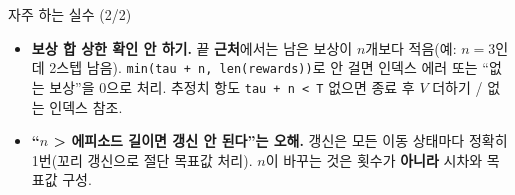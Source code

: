 \begin{frame}{자주 하는 실수 (2/2)}
  \begin{itemize}
    \item \textbf{보상 합 상한 확인 안 하기.} 끝 \textbf{근처}에서는
      남은 보상이 $n$개보다 적음(예: $n=3$인데 2스텝 남음).
      \texttt{min(tau + n, len(rewards))}로 안 걸면 인덱스 에러 또는
      ``없는 보상''을 0으로 처리. 추정치 항도 \texttt{tau + n < T}
      없으면 종료 후 $V$ 더하기 / 없는 인덱스 참조.
    \item \textbf{``$n$ > 에피소드 길이면 갱신 안 된다''는 오해.}
      갱신은 모든 이동 상태마다 정확히 1번(꼬리 갱신으로 절단
      목표값 처리). $n$이 바꾸는 것은 횟수가 \textbf{아니라} 시차와
      목표값 구성.
  \end{itemize}
\end{frame}
